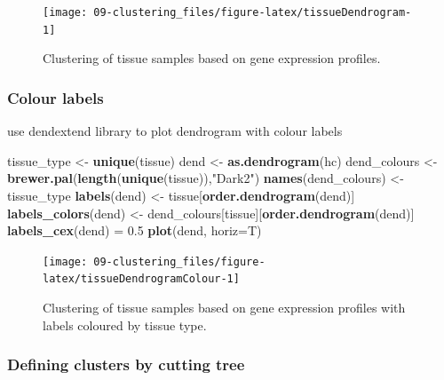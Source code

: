 \documentclass[]{book}
\newenvironment{Shaded}{\begin{snugshade}}{\end{snugshade}}
\newcommand{\KeywordTok}[1]{\textcolor[rgb]{0.13,0.29,0.53}{\textbf{{#1}}}}
\newcommand{\DataTypeTok}[1]{\textcolor[rgb]{0.13,0.29,0.53}{{#1}}}
\newcommand{\FloatTok}[1]{\textcolor[rgb]{0.00,0.00,0.81}{{#1}}}
\newcommand{\StringTok}[1]{\textcolor[rgb]{0.31,0.60,0.02}{{#1}}}
\newcommand{\NormalTok}[1]{{#1}}
\theoremstyle{definition}
\theoremstyle{definition}
\theoremstyle{definition}
\theoremstyle{remark}
\begin{document}
\begin{figure}

{\centering \texttt{[image: 09-clustering\_files/figure-latex/tissueDendrogram-1]} 

}

\caption{Clustering of tissue samples based on gene expression profiles. }\label{fig:tissueDendrogram}
\end{figure}

\subsubsection{Colour labels}\label{colour-labels}

use dendextend library to plot dendrogram with colour labels

\begin{Shaded}
\begin{Highlighting}[]
\NormalTok{tissue_type <-}\StringTok{ }\KeywordTok{unique}\NormalTok{(tissue)}
\NormalTok{dend <-}\StringTok{ }\KeywordTok{as.dendrogram}\NormalTok{(hc)}
\NormalTok{dend_colours <-}\StringTok{ }\KeywordTok{brewer.pal}\NormalTok{(}\KeywordTok{length}\NormalTok{(}\KeywordTok{unique}\NormalTok{(tissue)),}\StringTok{"Dark2"}\NormalTok{)}
\KeywordTok{names}\NormalTok{(dend_colours) <-}\StringTok{ }\NormalTok{tissue_type}
\KeywordTok{labels}\NormalTok{(dend) <-}\StringTok{ }\NormalTok{tissue[}\KeywordTok{order.dendrogram}\NormalTok{(dend)]}
\KeywordTok{labels_colors}\NormalTok{(dend) <-}\StringTok{ }\NormalTok{dend_colours[tissue][}\KeywordTok{order.dendrogram}\NormalTok{(dend)]}
\KeywordTok{labels_cex}\NormalTok{(dend) =}\StringTok{ }\FloatTok{0.5}
\KeywordTok{plot}\NormalTok{(dend, }\DataTypeTok{horiz=}\NormalTok{T)}
\end{Highlighting}
\end{Shaded}

\begin{figure}

{\centering \texttt{[image: 09-clustering\_files/figure-latex/tissueDendrogramColour-1]} 

}

\caption{Clustering of tissue samples based on gene expression profiles with labels coloured by tissue type. }\label{fig:tissueDendrogramColour}
\end{figure}

\subsubsection{Defining clusters by cutting
tree}\label{defining-clusters-by-cutting-tree}
\end{document}

